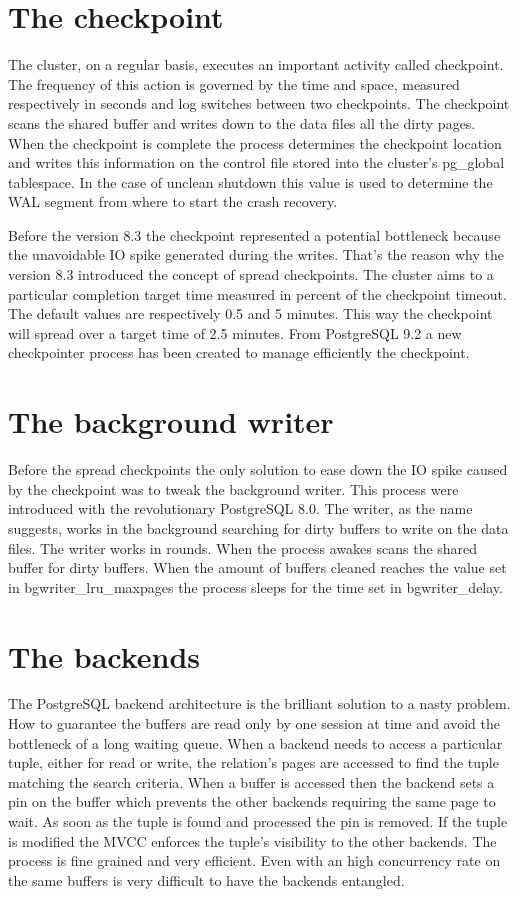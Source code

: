 \section{The checkpoint}
The cluster, on a regular basis, executes an important activity called checkpoint. The frequency 
of this action is governed by the time and space, measured respectively in seconds and log switches between 
two checkpoints. The checkpoint scans the shared buffer and writes down to the data files all the dirty 
pages. When the checkpoint is complete the process determines the checkpoint location and writes this 
information on the control file stored into the cluster's pg\_global tablespace. In the case of unclean 
shutdown this value is used to determine the WAL segment from where to start the crash recovery. \newline

Before the version 8.3 the checkpoint represented a potential bottleneck because the unavoidable IO spike 
generated during the writes. That's the reason why the version 8.3 introduced the concept of spread 
checkpoints. The cluster aims to a particular completion target time measured in percent of the checkpoint 
timeout. The default values are respectively 0.5 and 5 minutes. This way the checkpoint will spread over a 
target time of 2.5 minutes. From PostgreSQL 9.2 a new checkpointer process has been created to manage 
efficiently the checkpoint.


\section{The background writer}
Before the spread checkpoints the only solution to ease down the IO spike caused by the checkpoint was to 
tweak the background writer. This process were introduced with the revolutionary PostgreSQL 8.0. The 
writer, as the name suggests, works in the background searching for dirty buffers to write on the data 
files. The writer works in rounds. When the process awakes scans the shared buffer for dirty buffers. When 
the amount of buffers cleaned reaches the value set in bgwriter\_lru\_maxpages the process sleeps for the 
time set in bgwriter\_delay. 


\section{The backends}
The PostgreSQL backend architecture is the brilliant solution to a nasty problem. How to guarantee the 
buffers are read only by one session at time and avoid the bottleneck of a long waiting queue. When a 
backend needs to access a particular tuple, either for read or write, the relation's pages are accessed to 
find the tuple matching the search criteria. When a buffer is accessed then the backend sets a pin on the 
buffer which prevents the other backends requiring the same page to wait. As soon as the tuple is found and 
processed the pin is removed. If the tuple is modified the MVCC enforces the tuple's visibility to the other 
backends. The process is fine grained and very efficient. Even with an high concurrency rate on the same 
buffers is very difficult to have the backends entangled.\newline

